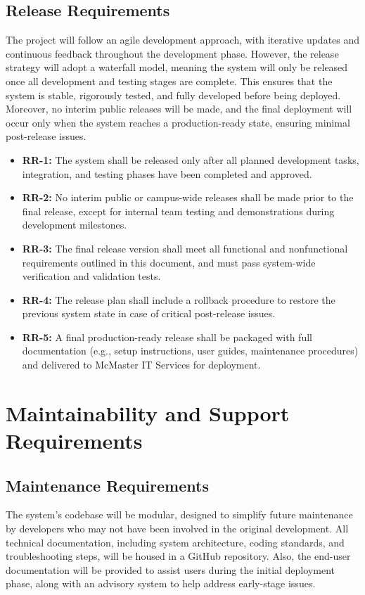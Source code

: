 \documentclass[12pt]{article}
\begin{document}
\subsection{Release Requirements}
The project will follow an agile development approach, with iterative updates and continuous feedback throughout the development phase. However, the release strategy will adopt a waterfall model, meaning the system will only be released once all development and testing stages are complete. This ensures that the system is stable, rigorously tested, and fully developed before being deployed. Moreover, no interim public releases will be made, and the final deployment will occur only when the system reaches a production-ready state, ensuring minimal post-release issues.

\begin{itemize}
    \item \textbf{RR-1:} The system shall be released only after all planned development tasks, integration, and testing phases have been completed and approved.
    \item \textbf{RR-2:} No interim public or campus-wide releases shall be made prior to the final release, except for internal team testing and demonstrations during development milestones.
    \item \textbf{RR-3:} The final release version shall meet all functional and nonfunctional requirements outlined in this document, and must pass system-wide verification and validation tests.
    \item \textbf{RR-4:} The release plan shall include a rollback procedure to restore the previous system state in case of critical post-release issues.
    \item \textbf{RR-5:} A final production-ready release shall be packaged with full documentation (e.g., setup instructions, user guides, maintenance procedures) and delivered to McMaster IT Services for deployment.
\end{itemize}


\section{Maintainability and Support Requirements}

\subsection{Maintenance Requirements}
The system's codebase will be modular, designed to simplify future maintenance by developers who may not have been involved in the original development. All technical documentation, including system architecture, coding standards, and troubleshooting steps, will be housed in a GitHub repository. Also, the end-user documentation will be provided to assist users during the initial deployment phase, along with an advisory system to help address early-stage issues.
\end{document}

